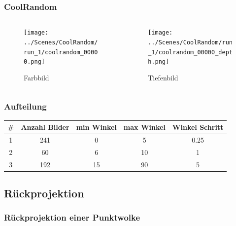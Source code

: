 \documentclass[xcolor=dvipsnames]{beamer}
\begin{document}
\begin{frame}
\frametitle{CoolRandom}
	\begin{columns}
		\begin{column}{5cm}
			\begin{figure}
				\texttt{[image: ../Scenes/CoolRandom/run\_1/coolrandom\_00000.png]}
				\caption{Farbbild}
			\end{figure}
		\end{column}
		\begin{column}{5cm}
			\begin{figure}
				\texttt{[image: ../Scenes/CoolRandom/run\_1/coolrandom\_00000\_depth.png]}
				\caption{Tiefenbild}
			\end{figure}
		\end{column}
	\end{columns}
\end{frame}

\begin{frame}
	\frametitle{Aufteilung}
	
	\begin{table}[h]
		\begin{tabular}{c|c|c|c|c}
			\# & Anzahl Bilder & min Winkel &  max Winkel & Winkel Schritt \\
			\hline
			1 & 241 & 0  & 5  & 0.25 \\
			2 & 60  & 6  & 10 & 1 	 \\
			3 & 192 & 15 & 90 & 5  	 \\
		\end{tabular}
		\centering
	\end{table}
	
\end{frame}

\subsection{Rückprojektion}
\begin{frame}
\frametitle{Rückprojektion einer Punktwolke}

\begin{figure}
	
\end{figure}

\end{frame}
\end{document}
